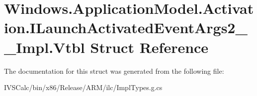\hypertarget{struct_windows_1_1_application_model_1_1_activation_1_1_i_launch_activated_event_args2_____impl_1_1_vtbl}{}\section{Windows.\+Application\+Model.\+Activation.\+I\+Launch\+Activated\+Event\+Args2\+\_\+\+\_\+\+Impl.\+Vtbl Struct Reference}
\label{struct_windows_1_1_application_model_1_1_activation_1_1_i_launch_activated_event_args2_____impl_1_1_vtbl}


The documentation for this struct was generated from the following file\+:\begin{DoxyCompactItemize}
\item 
I\+V\+S\+Calc/bin/x86/\+Release/\+A\+R\+M/ilc/Impl\+Types.\+g.\+cs\end{DoxyCompactItemize}
